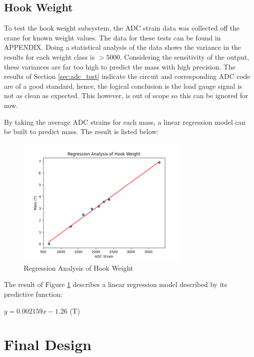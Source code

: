 \documentclass[12pt, a4paper]{article}
\begin{document}
\subsection{Hook Weight}
To test the hook weight subsystem, the ADC strain data was collected off the crane for known weight values. The data
for these tests can be found in APPENDIX. Doing a statistical analysis of the data shows the variance in the results
for each weight class is $>5000$. Considering the sensitivity of the output, these variances are far too high to predict
the mass with high precision. The results of Section \ref{sec:adc_test} indicate the circuit and corresponding ADC code
are of a good standard, hence, the logical conclusion is the load gauge signal is not as clean as expected. This however, is out of scope so 
this can be ignored for now.

By taking the average ADC strains for each mass, a linear regression model can be built to predict mass. The result is listed below:
\begin{figure}[H]
    \centering
    \includegraphics[width=0.75\textwidth]{regression.png}
    \caption{Regression Analysis of Hook Weight}
    \label{fig:regr_hook}
\end{figure}
The result of Figure \ref{fig:regr_hook} describes a linear regression model described by its predictive function:
\begin{center}
    $y=0.002159x-1.26$ (T)
\end{center}


\newpage
\section{Final Design}
\end{document}
